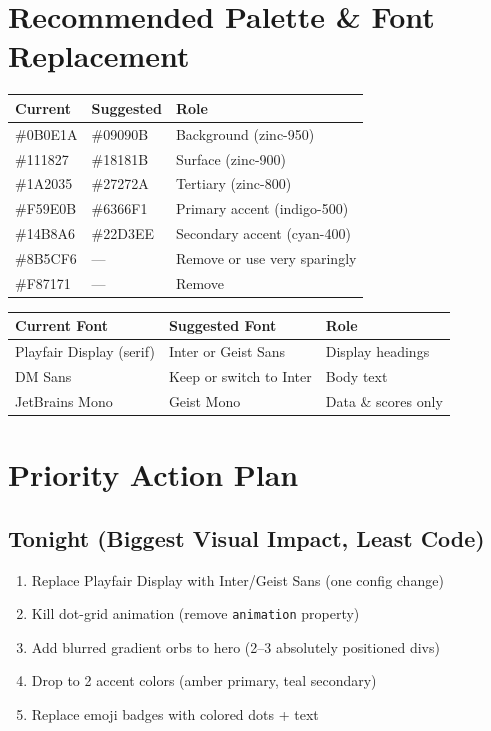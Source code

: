 \documentclass[11pt,letterpaper]{article}
\begin{document}
\section{Recommended Palette \& Font Replacement}

\begin{longtable}{>{\ttfamily}l >{\ttfamily}l l}
\toprule
\textbf{Current} & \textbf{Suggested} & \textbf{Role} \\
\midrule
\#0B0E1A & \#09090B & Background (zinc-950) \\
\#111827 & \#18181B & Surface (zinc-900) \\
\#1A2035 & \#27272A & Tertiary (zinc-800) \\
\#F59E0B & \#6366F1 & Primary accent (indigo-500) \\
\#14B8A6 & \#22D3EE & Secondary accent (cyan-400) \\
\#8B5CF6 & --- & Remove or use very sparingly \\
\#F87171 & --- & Remove \\
\bottomrule
\end{longtable}

\begin{longtable}{l l l}
\toprule
\textbf{Current Font} & \textbf{Suggested Font} & \textbf{Role} \\
\midrule
Playfair Display (serif) & Inter or Geist Sans & Display headings \\
DM Sans & Keep or switch to Inter & Body text \\
JetBrains Mono & Geist Mono & Data \& scores only \\
\bottomrule
\end{longtable}

\section{Priority Action Plan}

\subsection{Tonight (Biggest Visual Impact, Least Code)}
\begin{enumerate}[nosep]
    \item Replace Playfair Display with Inter/Geist Sans (one config change)
    \item Kill dot-grid animation (remove \texttt{animation} property)
    \item Add blurred gradient orbs to hero (2--3 absolutely positioned divs)
    \item Drop to 2 accent colors (amber primary, teal secondary)
    \item Replace emoji badges with colored dots + text
\end{enumerate}
\end{document}
